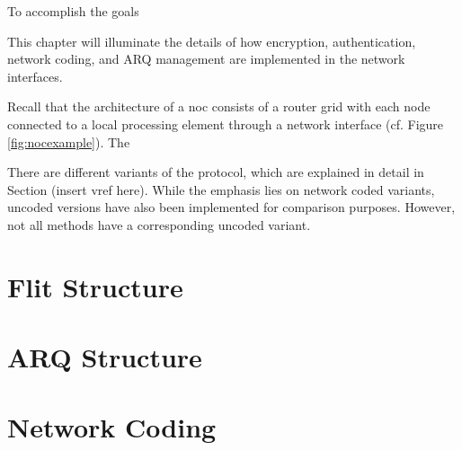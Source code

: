 To accomplish the goals 

This chapter will illuminate the details of how encryption, authentication, network coding, and ARQ management are implemented in the network
interfaces.

Recall that the architecture of a \gls{noc} consists of a router grid with each node connected to a local processing element through a network
interface (cf. Figure \vref{fig:nocexample}). The 

There are different variants of the protocol, which are explained in detail in Section (insert vref here). While the emphasis lies on network coded
variants, uncoded versions have also been implemented for comparison purposes. However, not all methods have a corresponding uncoded variant.

\section{Flit Structure}

\section{ARQ Structure}

\section{Network Coding}

